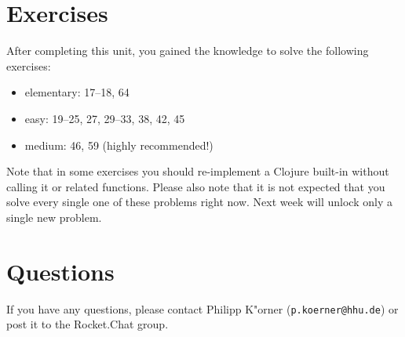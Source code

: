 \documentclass[11pt,a4paper]{article}
\begin{document}
\section{Exercises}
\begin{exercise}
    After completing this unit, you gained the knowledge to solve the following exercises:

    \begin{itemize}
        \item elementary: 17--18, 64
        \item easy: 19--25, 27, 29--33, 38, 42, 45
        \item medium: 46, 59 (highly recommended!)
    \end{itemize}

    Note that in some exercises you should re-implement a Clojure built-in without calling it or related functions.
    Please also note that it is not expected that you solve every single one of these problems right now.
    Next week will unlock only a single new problem.
\end{exercise}



	\section*{Questions}
	If you have any questions, please contact Philipp K"orner (\texttt{p.koerner@hhu.de}) or post it to the Rocket.Chat group.
\end{document}

